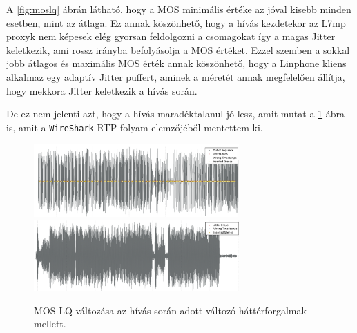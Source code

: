 A \ref{fig:moslq} ábrán látható, hogy a MOS minimális értéke az jóval kisebb minden 
esetben, mint az átlaga. Ez annak köszönhető, hogy a hívás kezdetekor az L7mp proxyk nem 
képesek elég gyorsan feldolgozni a csomagokat így a magas Jitter keletkezik, ami rossz 
irányba befolyásolja a MOS értéket. Ezzel szemben a sokkal jobb átlagos és maximális MOS 
érték annak köszönhető, hogy a Linphone kliens alkalmaz egy adaptív Jitter puffert, 
aminek a méretét annak megfelelően állítja, hogy mekkora Jitter keletkezik a hívás során. 


De ez nem jelenti azt, hogy a hívás maradéktalanul jó lesz, amit mutat a
\ref{fig:voiceComp} ábra is, amit a \texttt{WireShark} RTP folyam elemzőjéből mentettem 
ki. 

\begin{figure}[!ht]
	\centering
	\includegraphics[width=0.7\textwidth, keepaspectratio]{figures/calls60.png}
	\includegraphics[width=0.7\textwidth, keepaspectratio]{figures/calls20.png}
	\caption{MOS-LQ változása az hívás során adott változó háttérforgalmak mellett.}
	\label{fig:voiceComp}
\end{figure}

